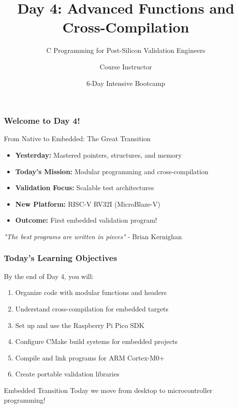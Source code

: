 \documentclass{beamer}
\title{Day 4: Advanced Functions and Cross-Compilation}
\subtitle{C Programming for Post-Silicon Validation Engineers}
\author{Course Instructor}
\date{6-Day Intensive Bootcamp}
\institute{Post-Silicon Validation Training Program}
\begin{document}
\frame{\titlepage}

\begin{frame}
\frametitle{Welcome to Day 4!}
\begin{center}
\Large From Native to Embedded: The Great Transition
\end{center}

\begin{itemize}
    \item \textbf{Yesterday:} Mastered pointers, structures, and memory
    \item \textbf{Today's Mission:} Modular programming and cross-compilation
    \item \textbf{Validation Focus:} Scalable test architectures
    \item \textbf{New Platform:} RISC-V RV32I (MicroBlaze-V)
    \item \textbf{Outcome:} First embedded validation program!
\end{itemize}

\vspace{0.5cm}
\begin{center}
\textit{"The best programs are written in pieces"} - Brian Kernighan
\end{center}
\end{frame}

\begin{frame}
\frametitle{Today's Learning Objectives}
By the end of Day 4, you will:

\begin{enumerate}
    \item Organize code with modular functions and headers
    \item Understand cross-compilation for embedded targets
    \item Set up and use the Raspberry Pi Pico SDK
    \item Configure CMake build systems for embedded projects
    \item Compile and link programs for ARM Cortex-M0+
    \item Create portable validation libraries
\end{enumerate}

\vspace{0.5cm}
\begin{alertblock}{Embedded Transition}
Today we move from desktop to microcontroller programming!
\end{alertblock}
\end{frame}
\end{document}
